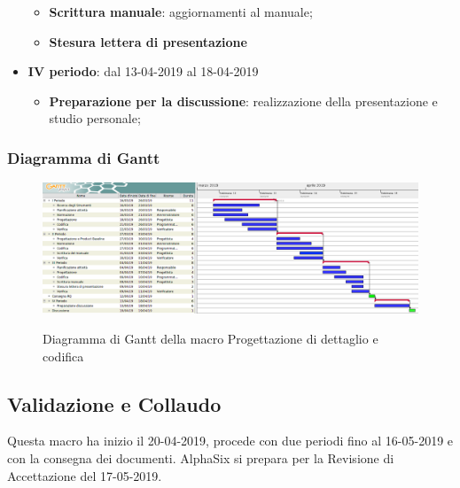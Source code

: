 \begin{itemize}
\begin{itemize}
    	        \item \textbf{Scrittura manuale}: aggiornamenti al manuale;
    	        \item \textbf{Stesura lettera di presentazione}
        	\end{itemize}
        	\item \textbf{IV periodo}: dal 13-04-2019 al 18-04-2019
			\begin{itemize}
				\item \textbf{Preparazione per la discussione}: realizzazione della presentazione e studio personale;
        	\end{itemize}
        \end{itemize}

        \begin{landscape}
			\subsubsection{Diagramma di Gantt}        
			\begin{figure}[H]
					\centering
					\includegraphics[scale=0.44]{img/Progettazione_di_dettaglio_e_codifica.png}\\
					\caption{Diagramma di Gantt della macro Progettazione di dettaglio e codifica}
			\end{figure}
		\end{landscape}
		\newpage

        \subsection{Validazione e Collaudo}
        Questa macro ha inizio il 20-04-2019, procede con due periodi fino al 16-05-2019 e con la consegna dei documenti. AlphaSix si
        prepara per la Revisione di Accettazione del 17-05-2019.
        
